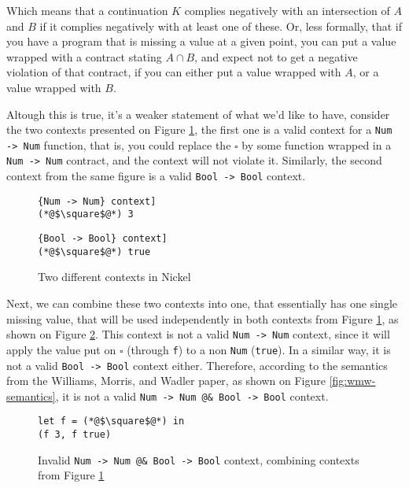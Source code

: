 \documentclass[sigplan,10pt,review,anonymous]{acmart}
\newcommand{\nickel}[1]{\lstinline[language=nickel]{#1}}
\begin{document}
Which means that a continuation $K$ complies negatively with an
intersection of $A$ and $B$ if it complies negatively with at least one of these.
Or, less formally, that if you have a program that is missing a value at a given point,
you can put a value wrapped with a contract stating $A \cap B$,
and expect not to get a negative violation of that contract,
if you can either put a value
wrapped with $A$, or a value wrapped with $B$.

Altough this is true, it's a weaker statement of what we'd like to have,
consider the two contexts presented on Figure \ref{fig:valid-contexts},
the first one is a valid context for a \nickel{Num -> Num} function,
that is, you could replace the $\square$ by some function wrapped in a
\nickel{Num -> Num} contract, and the context will not violate it.
Similarly, the second context from the same figure is a valid
\nickel{Bool -> Bool} context.

\begin{figure}[h]
\begin{lstlisting}[language=nickel, title=\nickel{Num -> Num} context]
(*@$\square$@*) 3
\end{lstlisting}
\begin{lstlisting}[language=nickel, title=\nickel{Bool -> Bool} context]
(*@$\square$@*) true
\end{lstlisting}
\caption{Two different contexts in Nickel}
\label{fig:valid-contexts}
\end{figure}

Next, we can combine these two contexts into one, that essentially
has one single missing value, that will be used independently in both contexts
from Figure \ref{fig:valid-contexts}, as shown on Figure \ref{fig:invalid-context}.
This context is not a valid \nickel{Num -> Num} context, since it will apply
the value put on $\square$ (through \nickel{f}) to a non \nickel{Num} (\nickel{true}).
In a similar way, it is not a valid \nickel{Bool -> Bool} context either.
Therefore, according to the semantics from the Williams, Morris, and Wadler paper, as
shown on Figure \ref{fig:wmw-semantics}, it is not a valid
\nickel{Num -> Num @& Bool -> Bool} context.

\begin{figure}[h]
\begin{lstlisting}[language=nickel]
let f = (*@$\square$@*) in
(f 3, f true)
\end{lstlisting}
\caption{Invalid \nickel{Num -> Num @& Bool -> Bool} context,
combining contexts from Figure \ref{fig:valid-contexts}}
\label{fig:invalid-context}
\end{figure}
\end{document}
